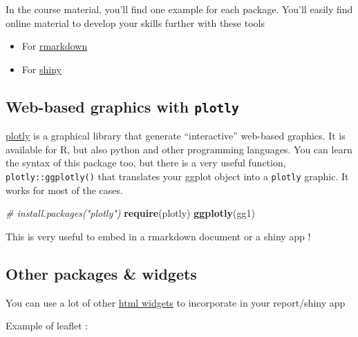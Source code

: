 \documentclass[
]{book}
\newenvironment{Shaded}{\begin{snugshade}}{\end{snugshade}}
\newcommand{\CommentTok}[1]{\textcolor[rgb]{0.56,0.35,0.01}{\textit{#1}}}
\newcommand{\DataTypeTok}[1]{\textcolor[rgb]{0.13,0.29,0.53}{#1}}
\newcommand{\KeywordTok}[1]{\textcolor[rgb]{0.13,0.29,0.53}{\textbf{#1}}}
\newcommand{\NormalTok}[1]{#1}
\newcommand{\OperatorTok}[1]{\textcolor[rgb]{0.81,0.36,0.00}{\textbf{#1}}}
\newcommand{\StringTok}[1]{\textcolor[rgb]{0.31,0.60,0.02}{#1}}
\providecommand{\tightlist}{%
  \setlength{\itemsep}{0pt}\setlength{\parskip}{0pt}}
\begin{document}
In the course material, you'll find one example for each package. You'll easily find online material to develop your skills further with these tools

\begin{itemize}
\tightlist
\item
  For \href{https://bookdown.org/yihui/rmarkdown/}{rmarkdown}
\item
  For \href{https://mastering-shiny.org/}{shiny}
\end{itemize}

\hypertarget{web-based-graphics-with-plotly}{%
\subsection{\texorpdfstring{Web-based graphics with \texttt{plotly}}{Web-based graphics with plotly}}\label{web-based-graphics-with-plotly}}

\href{https://plotly.com/r/}{plotly} is a graphical library that generate ``interactive'' web-based graphics. It is available for R, but also python and other programming languages. You can learn the syntax of this package too, but there is a very useful function, \texttt{plotly::ggplotly()} that translates your ggplot object into a \texttt{plotly} graphic. It works for most of the cases.

\begin{Shaded}
\begin{Highlighting}[]
\CommentTok{# install.packages("plotly")}
\KeywordTok{require}\NormalTok{(plotly)}
\KeywordTok{ggplotly}\NormalTok{(gg1)}
\end{Highlighting}
\end{Shaded}

This is very useful to embed in a rmarkdown document or a shiny app !

\hypertarget{other-packages-widgets}{%
\subsection{Other packages \& widgets}\label{other-packages-widgets}}

You can use a lot of other \href{https://www.htmlwidgets.org/index.html}{html widgets} to incorporate in your report/shiny app

Example of leaflet :

\begin{Shaded}
\end{Shaded}
\end{document}
